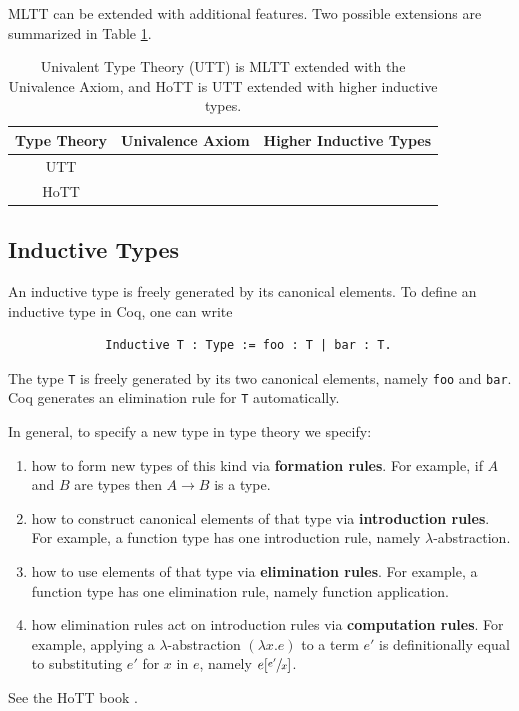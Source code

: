\documentclass{amsart}
\newcommand{\cmark}{\ding{51}}%
\newcommand{\xmark}{\ding{55}}
\theoremstyle{definition}
\renewcommand{\emph}{\textbf}
\begin{document}
MLTT can be extended with additional features.
Two possible extensions are summarized in Table \ref{tb:extensions-of-mltt}.
\begin{table}[h]
    \centering
    \begin{tabular}{|c||c|c|}\hline
        Type Theory & Univalence Axiom & Higher Inductive Types\\\hline
        UTT  & \cmark & \xmark\\\hline
        HoTT & \cmark & \cmark\\\hline
    \end{tabular}
    \caption{Univalent Type Theory (UTT) is MLTT extended with the Univalence Axiom, and HoTT is UTT extended with higher inductive types.}
    \label{tb:extensions-of-mltt}
\end{table}

\subsection{Inductive Types}
\label{sec:inductive-types}
An inductive type is freely generated by its canonical elements.
To define an inductive type in Coq, one can write
\begin{figure}[H]
    \centering
    \begin{verbatim}
        Inductive T : Type := foo : T | bar : T.
    \end{verbatim}
\end{figure}
The type \texttt{T} is freely generated by its two canonical elements, namely \texttt{foo} and \texttt{bar}.
Coq generates an elimination rule for \texttt{T} automatically.

In general, to specify a new type in type theory we specify:
\begin{enumerate}
    \item how to form new types of this kind via \emph{formation rules}.
    For example, if $A$ and $B$ are types then $A \to B$ is a type.
    \item how to construct canonical elements of that type via \emph{introduction rules}.
    For example, a function type has one introduction rule, namely $\lambda$-abstraction.
    \item how to use elements of that type via \emph{elimination rules}.
    For example, a function type has one elimination rule, namely function application.
    \item how elimination rules act on introduction rules via \emph{computation rules}.
    For example, applying a $\lambda$-abstraction $(\lambda x.e)$ to a term $e'$ is definitionally equal to substituting $e'$ for $x$ in $e$, namely $e[\sfrac{e'}{x}]$. 
\end{enumerate}
See the HoTT book \cite{hottbook}.
\end{document}
